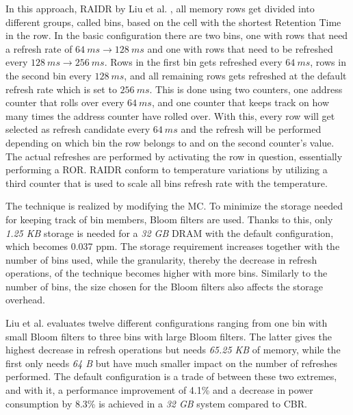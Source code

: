In this approach, RAIDR by Liu et al. \cite{raidr}, all memory rows get divided into different groups, called bins, based on the cell with the shortest Retention Time in the row. In the basic configuration there are two bins, one with rows that need a refresh rate of $64\:ms \to 128\:ms$ and one with rows that need to be refreshed every $128\:ms \to 256\:ms$. Rows in the first bin gets refreshed every $64\:ms$, rows in the second bin every $128\:ms$, and all remaining rows gets refreshed at the default refresh rate which is set to $256\:ms$. This is done using two counters, one address counter that rolls over every $64\:ms$, and one counter that keeps track on how many times the address counter have rolled over. With this, every row will get selected as refresh candidate every $64\:ms$ and the refresh will be performed depending on which bin the row belongs to and on the second counter's value. The actual refreshes are performed by activating the row in question, essentially performing a ROR. RAIDR conform to temperature variations by utilizing a third counter that is used to scale all bins refresh rate with the temperature.

The technique is realized by modifying the MC. To minimize the storage needed for keeping track of bin members, Bloom filters are used. Thanks to this, only \textit{1.25 KB} storage is needed for a \textit{32 GB} DRAM with the default configuration, which becomes 0.037 ppm. The storage requirement increases together with the number of bins used, while the granularity, thereby the decrease in refresh operations, of the technique becomes higher with more bins. Similarly to the number of bins, the size chosen for the Bloom filters also affects the storage overhead. 

Liu et al. evaluates twelve different configurations ranging from one bin with small Bloom filters to three bins with large Bloom filters. The latter gives the highest decrease in refresh operations but needs \textit{65.25 KB} of memory, while the first only needs \textit{64 B} but have much smaller impact on the number of refreshes performed. The default configuration is a trade of between these two extremes, and with it, a performance improvement of 4.1\% and a decrease in power consumption by 8.3\% is achieved in a \textit{32 GB} system compared to CBR.
